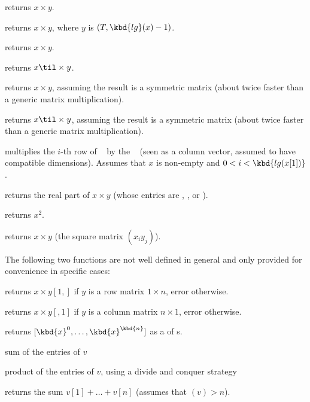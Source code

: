  returns $x\times y$.

 returns $x \times y$, where $y$
is $(T, \kbd{lg}(x)-1)$.

 returns $x\times y$.

 returns $x\til \times y$.

 returns $x\times y$, assuming
the result is a symmetric matrix (about twice faster than a generic matrix
multiplication).

 returns $x\til \times y$, assuming
the result is a symmetric matrix (about twice faster than a generic matrix
multiplication).

 multiplies the $i$-th row of
~ by the ~ (seen as a column vector, assumed
to have compatible dimensions). Assumes that $x$ is non-empty and $0 < i <
\kbd{lg(x[1])}$.

 returns the real part of $x\times y$
(whose entries are , ,  or ).

 returns $x^2$.

 returns $x\times y$ (the square matrix
$(x_iy_j)$).

The following two functions are not well defined in general and only provided
for convenience in specific cases:

 returns $x\times y[1,]$ if $y$ is
a row matrix $1\times n$, error otherwise.

 returns $x\times y[,1]$ if $y$ is
a column matrix $n\times 1$, error otherwise.

 returns $[\kbd{x}^0,
\dots, \kbd{x}^\kbd{n}]$ as a  of s.

\smallskip

 sum of the entries of $v$

 product of the entries of $v$, using
a divide and conquer strategy

 returns the sum $v[1] + \dots + v[n]$
(assumes that $(v) > n$).

